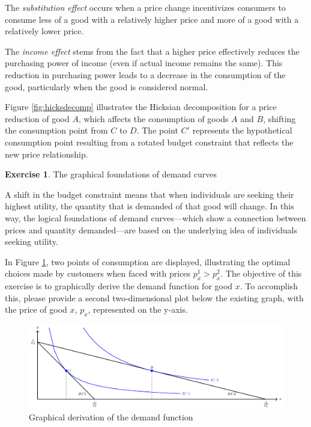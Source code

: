 \documentclass[
  12pt,
  oneside]{book}
\theoremstyle{definition}
\theoremstyle{definition}
\theoremstyle{definition}
\newtheorem{exercise}{Exercise}[chapter]
\theoremstyle{definition}
\theoremstyle{remark}
\begin{document}
The \emph{substitution effect} occurs when a price change incentivizes consumers to consume less of a good with a relatively higher price and more of a good with a relatively lower price.

The \emph{income effect} stems from the fact that a higher price effectively reduces the purchasing power of income (even if actual income remains the same). This reduction in purchasing power leads to a decrease in the consumption of the good, particularly when the good is considered normal.

Figure \ref{fig:hicksdecomp} illustrates the Hicksian decomposition for a price reduction of good \(A\), which affects the consumption of goods \(A\) and \(B\), shifting the consumption point from \(C\) to \(D\). The point \(C'\) represents the hypothetical consumption point resulting from a rotated budget constraint that reflects the new price relationship.

\begin{exercise}
\protect\hypertarget{exr:twopointsofconsumption}{}\label{exr:twopointsofconsumption}The graphical foundations of demand curves

A shift in the budget constraint means that when individuals are seeking their highest utility, the quantity that is demanded of that good will change. In this way, the logical foundations of demand curves---which show a connection between prices and quantity demanded---are based on the underlying idea of individuals seeking utility.

In Figure \ref{fig:tpoc}, two points of consumption are displayed, illustrating the optimal choices made by customers when faced with prices \(p_x^1>p_x^2\). The objective of this exercise is to graphically derive the demand function for good \(x\). To accomplish this, please provide a second two-dimensional plot below the existing graph, with the price of good \(x\), \(p_x\), represented on the y-axis.
\end{exercise}

\begin{figure}
\centering
\includegraphics[width=1\textwidth,height=\textheight]{fig/twopointsofconsumption.png}
\caption{\label{fig:tpoc} Graphical derivation of the demand function}
\end{figure}
\end{document}

